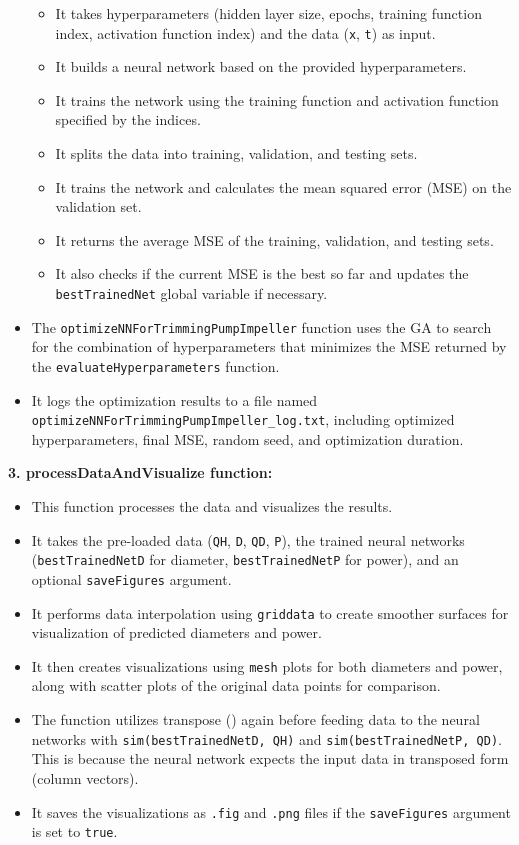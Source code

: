 \documentclass[
  super,
  review,
  3p]{elsarticle}
\providecommand{\tightlist}{%
  \setlength{\itemsep}{0pt}\setlength{\parskip}{0pt}}\usepackage{longtable,booktabs,array}
\begin{document}
\begin{itemize}
  \begin{itemize}
  \tightlist
  \item
    It takes hyperparameters (hidden layer size, epochs, training
    function index, activation function index) and the data (\texttt{x},
    \texttt{t}) as input.
  \item
    It builds a neural network based on the provided hyperparameters.
  \item
    It trains the network using the training function and activation
    function specified by the indices.
  \item
    It splits the data into training, validation, and testing sets.
  \item
    It trains the network and calculates the mean squared error (MSE) on
    the validation set.
  \item
    It returns the average MSE of the training, validation, and testing
    sets.
  \item
    It also checks if the current MSE is the best so far and updates the
    \texttt{bestTrainedNet} global variable if necessary.
  \end{itemize}
\item
  The \texttt{optimizeNNForTrimmingPumpImpeller} function uses the GA to
  search for the combination of hyperparameters that minimizes the MSE
  returned by the \texttt{evaluateHyperparameters} function.
\item
  It logs the optimization results to a file named
  \texttt{optimizeNNForTrimmingPumpImpeller\_log.txt}, including
  optimized hyperparameters, final MSE, random seed, and optimization
  duration.
\end{itemize}

\textbf{3. processDataAndVisualize function:}

\begin{itemize}
\tightlist
\item
  This function processes the data and visualizes the results.
\item
  It takes the pre-loaded data (\texttt{QH}, \texttt{D}, \texttt{QD},
  \texttt{P}), the trained neural networks (\texttt{bestTrainedNetD} for
  diameter, \texttt{bestTrainedNetP} for power), and an optional
  \texttt{saveFigures} argument.
\item
  It performs data interpolation using \texttt{griddata} to create
  smoother surfaces for visualization of predicted diameters and power.
\item
  It then creates visualizations using \texttt{mesh} plots for both
  diameters and power, along with scatter plots of the original data
  points for comparison.
\item
  The function utilizes transpose (\texttt{\textquotesingle{}}) again
  before feeding data to the neural networks with
  \texttt{sim(bestTrainedNetD,\ QH\textquotesingle{})} and
  \texttt{sim(bestTrainedNetP,\ QD\textquotesingle{})}. This is because
  the neural network expects the input data in transposed form (column
  vectors).
\item
  It saves the visualizations as \texttt{.fig} and \texttt{.png} files
  if the \texttt{saveFigures} argument is set to \texttt{true}.
\end{itemize}
\end{document}
